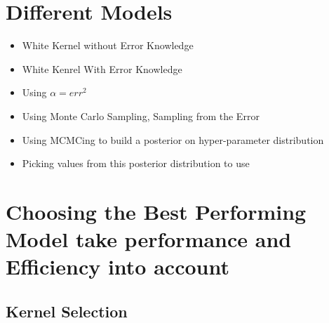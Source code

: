 \documentclass{article}
\begin{document}
\section{Different Models}
\begin{itemize}
    \item White Kernel without Error Knowledge
    \item White Kenrel With Error Knowledge
    \item Using $\alpha = err^2$
    \item Using Monte Carlo Sampling, Sampling from the Error
    \item Using MCMCing to build a posterior on hyper-parameter distribution
    \item Picking values from this posterior distribution to use
\end{itemize}

\section{Choosing the Best Performing Model take performance and Efficiency into account}

\subsection{Kernel Selection}





\end{document}
